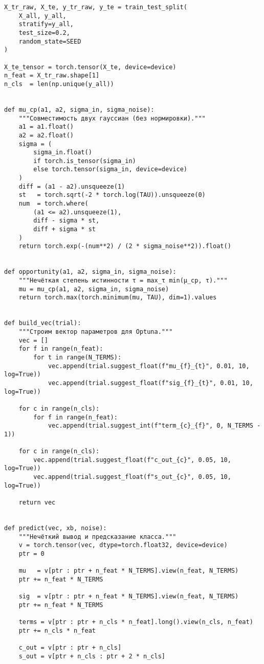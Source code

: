 \begin{verbatim}
X_tr_raw, X_te, y_tr_raw, y_te = train_test_split(
    X_all, y_all,
    stratify=y_all,
    test_size=0.2,
    random_state=SEED
)

X_te_tensor = torch.tensor(X_te, device=device)
n_feat = X_tr_raw.shape[1]
n_cls  = len(np.unique(y_all))


def mu_cp(a1, a2, sigma_in, sigma_noise):
    """Совместимость двух гауссиан (без нормировки)."""
    a1 = a1.float()
    a2 = a2.float()
    sigma = (
        sigma_in.float()
        if torch.is_tensor(sigma_in)
        else torch.tensor(sigma_in, device=device)
    )
    diff = (a1 - a2).unsqueeze(1)
    st   = torch.sqrt(-2 * torch.log(TAU)).unsqueeze(0)
    num  = torch.where(
        (a1 <= a2).unsqueeze(1),
        diff - sigma * st,
        diff + sigma * st
    )
    return torch.exp(-(num**2) / (2 * sigma_noise**2)).float()


def opportunity(a1, a2, sigma_in, sigma_noise):
    """Нечёткая степень истинности τ = max_τ min(μ_cp, τ)."""
    mu = mu_cp(a1, a2, sigma_in, sigma_noise)
    return torch.max(torch.minimum(mu, TAU), dim=1).values


def build_vec(trial):
    """Строим вектор параметров для Optuna."""
    vec = []
    for f in range(n_feat):
        for t in range(N_TERMS):
            vec.append(trial.suggest_float(f"mu_{f}_{t}", 0.01, 10, log=True))
            vec.append(trial.suggest_float(f"sig_{f}_{t}", 0.01, 10, log=True))

    for c in range(n_cls):
        for f in range(n_feat):
            vec.append(trial.suggest_int(f"term_{c}_{f}", 0, N_TERMS - 1))

    for c in range(n_cls):
        vec.append(trial.suggest_float(f"c_out_{c}", 0.05, 10, log=True))
        vec.append(trial.suggest_float(f"s_out_{c}", 0.05, 10, log=True))

    return vec


def predict(vec, xb, noise):
    """Нечёткий вывод и предсказание класса."""
    v = torch.tensor(vec, dtype=torch.float32, device=device)
    ptr = 0

    mu   = v[ptr : ptr + n_feat * N_TERMS].view(n_feat, N_TERMS)
    ptr += n_feat * N_TERMS

    sig  = v[ptr : ptr + n_feat * N_TERMS].view(n_feat, N_TERMS)
    ptr += n_feat * N_TERMS

    terms = v[ptr : ptr + n_cls * n_feat].long().view(n_cls, n_feat)
    ptr += n_cls * n_feat

    c_out = v[ptr : ptr + n_cls]
    s_out = v[ptr + n_cls : ptr + 2 * n_cls]


\end{verbatim}
